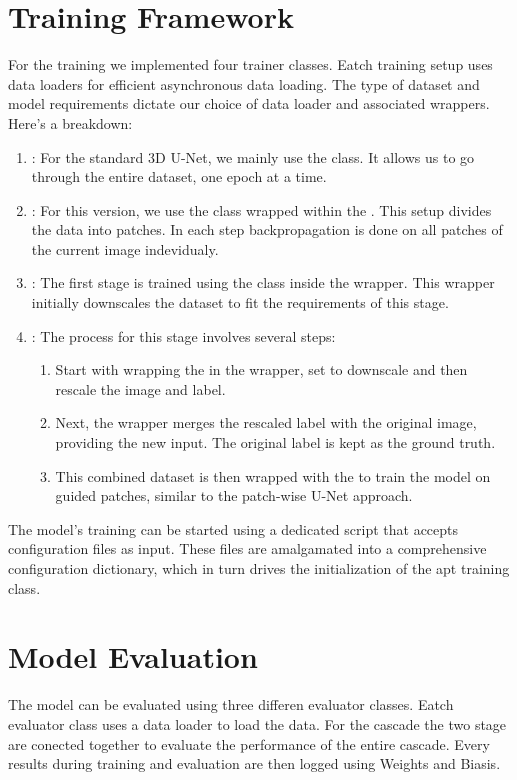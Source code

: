 \section{Training Framework}
For the training we implemented four trainer classes. Eatch training setup uses data loaders for efficient asynchronous data loading.
The type of dataset and model requirements dictate our choice of data loader and associated wrappers. Here's a breakdown:

\begin{enumerate}
	\item {}: For the standard 3D U-Net, we mainly use the  class. It allows us to go through the entire dataset, one epoch at a time.
	\item {}: For this version, we use the  class wrapped within the . This setup divides the data into patches.
	In each step backpropagation is done on all patches of the current image indevidualy.
	\item {}: The first stage is trained using the  class inside the  wrapper. This wrapper initially downscales the dataset to fit the requirements of this stage.
	\item {}: The process for this stage involves several steps:
	\begin{enumerate}
		\item Start with wrapping the  in the   wrapper, set to downscale and then rescale the image and label.
		\item Next, the  wrapper merges the rescaled label with the original image, providing the new input. The original label is kept as the ground truth.
		\item This combined dataset is then wrapped with the  to train the model on guided patches, similar to the patch-wise U-Net approach.
	\end{enumerate}
\end{enumerate}

\noindent The model's training can be started using a dedicated script that accepts configuration files as input. These files are amalgamated into a comprehensive configuration dictionary,
which in turn drives the initialization of the apt training class.\\[1ex]
\section{Model Evaluation}
The model can be evaluated using three differen evaluator classes. Eatch evaluator class uses a data loader to load the data.
For the cascade the two stage are conected together to evaluate the performance of the entire cascade. Every results during training and evaluation are then logged using Weights and Biasis.

